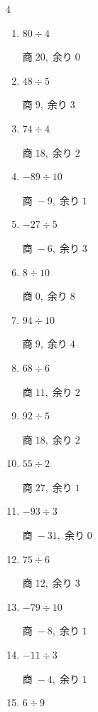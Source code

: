 \begin{multicols}{4}
\begin{enumerate}
        $商\; -25,\; 余り\; 0$

  \item $80 \div 4$

        $商\; 20,\; 余り\; 0$

  \item $48 \div 5$

        $商\; 9,\; 余り\; 3$

  \item $74 \div 4$

        $商\; 18,\; 余り\; 2$

  \item $-89 \div 10$

        $商\; -9,\; 余り\; 1$

  \item $-27 \div 5$

        $商\; -6,\; 余り\; 3$

  \item $8 \div 10$

        $商\; 0,\; 余り\; 8$

  \item $94 \div 10$

        $商\; 9,\; 余り\; 4$

\columnbreak %

  \item $68 \div 6$

        $商\; 11,\; 余り\; 2$

  \item $92 \div 5$

        $商\; 18,\; 余り\; 2$

  \item $55 \div 2$

        $商\; 27,\; 余り\; 1$

  \item $-93 \div 3$

        $商\; -31,\; 余り\; 0$

  \item $75 \div 6$

        $商\; 12,\; 余り\; 3$

  \item $-79 \div 10$

        $商\; -8,\; 余り\; 1$

  \item $-11 \div 3$

        $商\; -4,\; 余り\; 1$

  \item $6 \div 9$


\end{enumerate}
\end{multicols}
